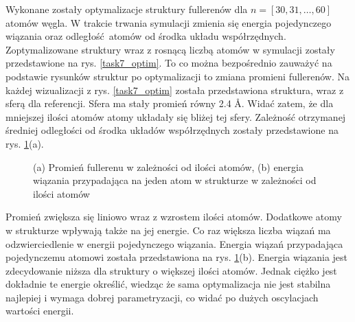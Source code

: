 \documentclass[a4paper,12pt]{article}
\begin{document}
	Wykonane zostały optymalizacje struktury fullerenów dla $n = [30,31,\dots,60]$ atomów węgla.
	W trakcie trwania symulacji zmienia się energia pojedynczego wiązania oraz odległość atomów od środka układu współrzędnych. Zoptymalizowane struktury wraz z rosnącą liczbą atomów w symulacji zostały przedstawione na rys. \ref{task7_optim}.
	To co można bezpośrednio zauważyć na podstawie rysunków struktur po optymalizacji to zmiana promieni fullerenów.
	Na każdej wizualizacji z rys. \ref{task7_optim} została przedstawiona struktura, wraz z sferą dla referencji. 
	Sfera ma stały promień równy 2.4 \AA. 
	Widać zatem, że dla mniejszej ilości atomów atomy układały się bliżej tej sfery.
	Zależność otrzymanej średniej odległości od środka układów współrzędnych zostały przedstawione na rys. \ref{task7_r}(a).
	\begin{figure}[h]
		\centering
		\begin{subfigure}{0.49\textwidth}
			\centering
			
			\caption{}
		\end{subfigure}
		\begin{subfigure}{0.49\textwidth}
			\centering
			
			\caption{}
		\end{subfigure}
		\caption{(a) Promień fullerenu w zależności od ilości atomów, (b) energia wiązania przypadająca na jeden atom w strukturze w zależności od ilości atomów}
		\label{task7_r}
	\end{figure}
	Promień zwiększa się liniowo wraz z wzrostem ilości atomów. 
	Dodatkowe atomy w strukturze wpływają także na jej energie. 
	Co raz większa liczba wiązań ma odzwierciedlenie w energii pojedynczego wiązania.
	Energia wiązań przypadająca pojedynczemu atomowi została przedstawiona na rys. \ref{task7_r}(b).
	Energia wiązania jest zdecydowanie niższa dla struktury o większej ilości atomów.
	Jednak ciężko jest dokładnie te energie określić, wiedząc że sama optymalizacja nie jest stabilna najlepiej i wymaga dobrej parametryzacji, co widać po dużych oscylacjach wartości energii.
\end{document}
